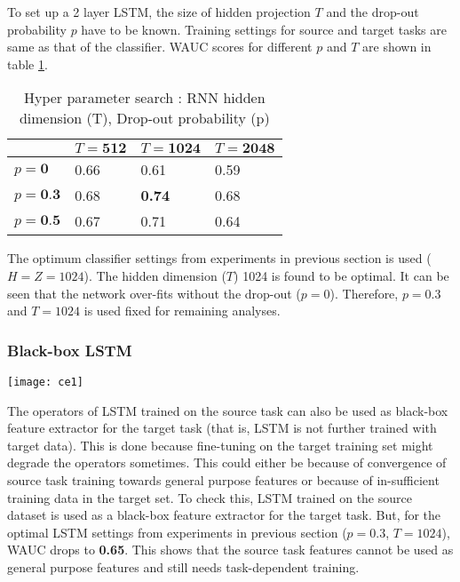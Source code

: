 \noindent To set up a 2 layer LSTM, the size of hidden projection $T$ and the drop-out probability $p$ have to be known. Training settings for source and target tasks are same as that of the classifier. WAUC scores for different  $p$ and $T$ are shown in table \ref{tabl:a4}.
\begin{table}[!htb]
\centering
\begin{tabular}{| p{} | p{}| p{}| p{} |}
\hline
& $T = \textbf{512}$ & $T = \textbf{1024}$ & $T = \textbf{2048}$\\
\hline
$p = \textbf{0}$  & 0.66 & 0.61 & 0.59\\
\hline
$p = \textbf{0.3}$ & 0.68 & \textbf{0.74} & 0.68\\ 
\hline
$p = \textbf{0.5}$ & 0.67 & 0.71 & 0.64\\
\hline
\end{tabular}
\caption{Hyper parameter search : RNN hidden dimension (T), Drop-out probability (p)}\label{tabl:a4} 
\end{table}
\FloatBarrier

\noindent The optimum classifier settings from experiments in previous section is used ($H = Z = 1024$). The hidden dimension ($T$) 1024 is found to be optimal. It can be seen that the network over-fits without the drop-out ($p = 0$). Therefore, $p = 0.3$ and $T = 1024$ is used fixed for remaining analyses.

\subsubsection{Black-box LSTM}
\begin{minipage}{0.15\textwidth}
\texttt{[image: ce1]}
\end{minipage}
\begin{minipage}{0.80\textwidth}
The operators of LSTM trained on the source task can also be used as black-box feature extractor for the target task (that is, LSTM is not further trained with target data). This is done because fine-tuning on the target training set might degrade the operators sometimes. This could either be because of convergence of source task training towards general purpose features or because of in-sufficient training data in the target set. To check this, LSTM trained on the source dataset is used as a black-box feature extractor for the target task. But, for the optimal LSTM settings from experiments in previous section ($p = 0.3$, $T=1024$), WAUC drops to \textbf{0.65}. This shows that the source task features cannot be used as general purpose features and still needs task-dependent training. 
\end{minipage}

